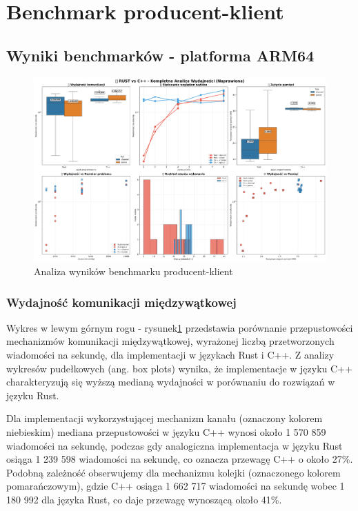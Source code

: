\section{Benchmark producent-klient}

\subsection{Wyniki benchmarków - platforma ARM64}

\begin{figure}[H]
    \centering
    \includegraphics[width=\textwidth]{analiza/images/conc/pc/arm/mega_overview_2x3.png}
    \caption{Analiza wyników benchmarku producent-klient}
    \label{analiza_benchmarku_producent_klient}
\end{figure}

\subsubsection{Wydajność komunikacji międzywątkowej}
Wykres w lewym górnym rogu - rysunek\ref{analiza_benchmarku_producent_klient} przedstawia porównanie przepustowości mechanizmów komunikacji międzywątkowej, wyrażonej liczbą przetworzonych wiadomości na sekundę, dla implementacji w językach Rust i C++. Z analizy wykresów pudełkowych (ang. box plots) wynika, że implementacje w języku C++ charakteryzują się wyższą medianą wydajności w porównaniu do rozwiązań w języku Rust.

Dla implementacji wykorzystującej mechanizm kanału (oznaczony kolorem niebieskim) mediana przepustowości w języku C++ wynosi około 1 570 859 wiadomości na sekundę, podczas gdy analogiczna implementacja w języku Rust osiąga 1 239 598 wiadomości na sekundę, co oznacza przewagę C++ o około 27\%. Podobną zależność obserwujemy dla mechanizmu kolejki (oznaczonego kolorem pomarańczowym), gdzie C++ osiąga 1 662 717 wiadomości na sekundę wobec 1 180 992 dla języka Rust, co daje przewagę wynoszącą około 41\%.

